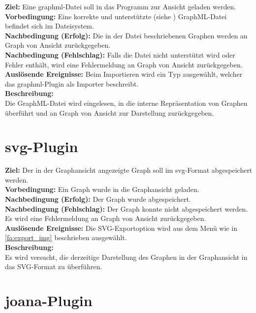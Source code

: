 \label{fa:importgraphml}
\textbf{Ziel:} Eine \gls{graphml}-Datei soll in das Programm zur Ansicht geladen werden.\\
\textbf{Vorbedingung:} Eine korrekte und unterstützte (siehe ) GraphML-Datei befindet sich im Dateisystem.\\
\textbf{Nachbedingung (Erfolg):} Die in der Datei beschriebenen Graphen werden an Graph von Ansicht zurückgegeben.\\
\textbf{Nachbedingung (Fehlschlag):} Falls die Datei nicht unterstützt wird oder Fehler enthält, wird eine Fehlermeldung an Graph von Ansicht zurückgegeben.\\
\textbf{Auslösende Ereignisse:} Beim Importieren wird ein Typ ausgewählt, welcher das \gls{graphml}-Plugin als Importer beschreibt.\\
\textbf{Beschreibung:}\\
Die GraphML-Datei wird eingelesen, in die interne Repräsentation von Graphen überführt und an Graph von Ansicht zur Darstellung zurückgegeben.

\section{\gls{svg}-Plugin}
\setcounter{fanr}{400}

\label{fa:export_svg}
\textbf{Ziel:} Der in der Graphansicht angezeigte Graph soll im \gls{svg}-Format abgespeichert werden.\\
\textbf{Vorbedingung:} Ein Graph wurde in die Graphansicht geladen.\\
\textbf{Nachbedingung (Erfolg):} Der Graph wurde abgespeichert.\\
\textbf{Nachbedingung (Fehlschlag):} Der Graph konnte nicht abgespeichert werden. Es wird eine Fehlermeldung an Graph von Ansicht zurückgegeben.\\
\textbf{Auslösende Ereignisse:} Die SVG-Exportoption wird aus dem Menü wie in \ref{fa:export_img} beschrieben ausgewählt.\\
\textbf{Beschreibung:}\\
Es wird versucht, die derzeitige Darstellung des Graphen in der Graphansicht in das SVG-Format zu überführen.

\section{\gls{joana}-Plugin}
\setcounter{fanr}{500}


